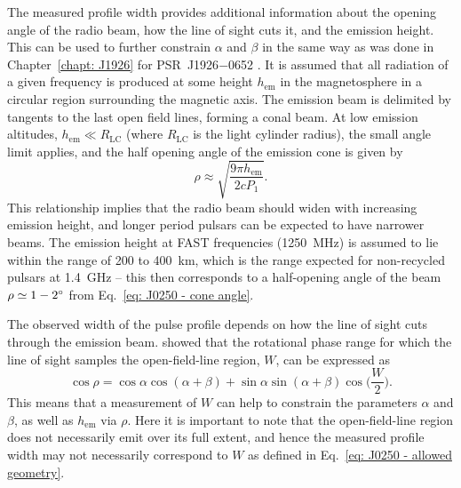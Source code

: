 The measured profile width provides additional information about the opening angle of the radio beam, how the line of sight cuts it, and the emission height. This can be used to further constrain $\alpha$ and $\beta$ in the same way as was done in Chapter~\ref{chapt: J1926} for PSR~J1926$-$0652 \citep[see also][]{RWJx2015a}. It is assumed that all radiation of a given frequency is produced at some height $h_\mathrm{em}$ in the magnetosphere in a circular region surrounding the magnetic axis. The emission beam is delimited by tangents to the last open field lines, forming a conal beam. At low emission altitudes, $h_\mathrm{em} \ll R_\mathrm{LC}$ (where $R_\mathrm{LC}$ is the light cylinder radius), the small angle limit applies, and the half opening angle of the emission cone is given by 
\begin{equation}
\label{eq: J0250 - cone angle}
    \rho \approx \sqrt{\frac{9\pi h_\mathrm{em}}{2cP_1}}.
\end{equation}
This relationship implies that the radio beam should widen with increasing emission height, and longer period pulsars can be expected to have narrower beams. The emission height at FAST frequencies (1250~MHz) is assumed to lie within the range of 200 to 400~km, which is the range expected for non-recycled pulsars at 1.4~GHz \citep[e.g.][]{MRxx2002, JKxx2019} -- this then corresponds to a half-opening angle of the beam $\rho \simeq 1 - 2^\circ$ from Eq.~\eqref{eq: J0250 - cone angle}. 

The observed width of the pulse profile depends on how the line of sight cuts through the emission beam. \citet{GGRx1984} showed that the rotational phase range for which the line of sight samples the open-field-line region, $W$, can be expressed as
\begin{equation}
\label{eq: J0250 - allowed geometry}
    \cos\rho = \cos\alpha\cos(\alpha+\beta)+\sin\alpha\sin(\alpha+\beta)\cos\bigg(\frac{W}{2}\bigg).
\end{equation}
This means that a measurement of $W$ can help to constrain the parameters $\alpha$ and $\beta$, as well as $h_\mathrm{em}$ via $\rho$. Here it is important to note that the open-field-line region does not necessarily emit over its full extent, and hence the measured profile width may not necessarily correspond to $W$ as defined in Eq.~\eqref{eq: J0250 - allowed geometry}.

